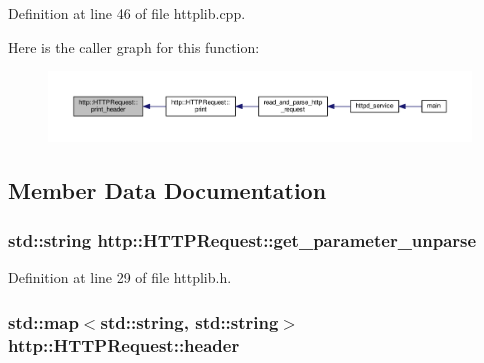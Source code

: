 Definition at line 46 of file httplib.\+cpp.



Here is the caller graph for this function\+:\nopagebreak
\begin{figure}[H]
\begin{center}
\leavevmode
\includegraphics[width=350pt]{structhttp_1_1HTTPRequest_a4d18577ce9b622e694af75ca311b4a6e_icgraph}
\end{center}
\end{figure}




\subsection{Member Data Documentation}
\subsubsection[{\texorpdfstring{get\+\_\+parameter\+\_\+unparse}{get_parameter_unparse}}]{\setlength{\rightskip}{0pt plus 5cm}std\+::string http\+::\+H\+T\+T\+P\+Request\+::get\+\_\+parameter\+\_\+unparse}\hypertarget{structhttp_1_1HTTPRequest_ad732e85a644dbb86848c7b39d9247268}{}\label{structhttp_1_1HTTPRequest_ad732e85a644dbb86848c7b39d9247268}


Definition at line 29 of file httplib.\+h.

\subsubsection[{\texorpdfstring{header}{header}}]{\setlength{\rightskip}{0pt plus 5cm}std\+::map$<$std\+::string, std\+::string$>$ http\+::\+H\+T\+T\+P\+Request\+::header}\hypertarget{structhttp_1_1HTTPRequest_ae729716c68628e6329899aa27c05206f}{}\label{structhttp_1_1HTTPRequest_ae729716c68628e6329899aa27c05206f}


